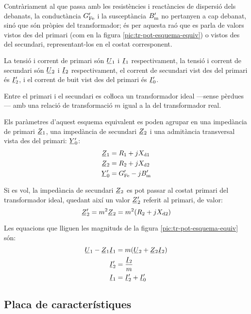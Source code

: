 Contràriament al que passa amb les resistències i reactàncies de dispersió dels debanats, la conductància $G_\mathrm{Fe}'$ i la susceptància $B_\mathrm{m}'$ no pertanyen a cap debanat, sinó que són pròpies del transformador; és per aquesta raó que es parla de valors vistos des del primari (com en la figura \vref{pic:tr-pot-esquema-equiv}) o vistos des del secundari, representant-los en el costat corresponent.

La tensió i corrent de primari són $\cmplx{U}_1$ i $\cmplx{I}_1$ respectivament, la tensió i corrent de secundari són $\cmplx{U}_2$ i $\cmplx{I}_2$ respectivament, el corrent de secundari vist des del primari és $\cmplx{I}_2'$, i el corrent de buit vist des del primari és $\cmplx{I}_0'$.

Entre el primari i el secundari es coŀloca un transformador ideal ---sense pèrdues--- amb una relació de transformació $m$ igual a la del transformador real.

Els paràmetres d'aquest esquema equivalent es poden agrupar en una impedància de primari $\cmplx{Z}_1$, una impedància de secundari $\cmplx{Z}_2$ i una  admitància transversal vista des del primari: $\cmplx{Y}_0'$:
\begin{align}
    \cmplx{Z}_1 &= R_1 + j X\ped{d1} \\
    \cmplx{Z}_2 &= R_2 + j X\ped{d2}\\
    \cmplx{Y}_0' &= G\ped{Fe}'- j B\ped{m}'
\end{align}

Si es vol, la impedància de secundari $\cmplx{Z}_2$ es pot passar al costat primari del transformador ideal, quedant així un valor $\cmplx{Z}_2'$ referit al primari, de valor:
\begin{equation}
    \cmplx{Z}_2' = m^2 \cmplx{Z}_2 =  m^2 (R_2 + j X\ped{d2})
\end{equation}

Les equacions que lliguen les magnituds de la figura \vref{pic:tr-pot-esquema-equiv} són:
\begin{align}
    \cmplx{U}_1 - \cmplx{Z}_1 \cmplx{I}_1 &= m ( \cmplx{U}_2  + \cmplx{Z}_2 \cmplx{I}_2 ) \\
    \cmplx{I}_2' &=   \frac{\cmplx{I}_2}{m} \\
    \cmplx{I}_1  &=   \cmplx{I}_2' + \cmplx{I}_0'
\end{align}


\subsection{Placa de característiques}

